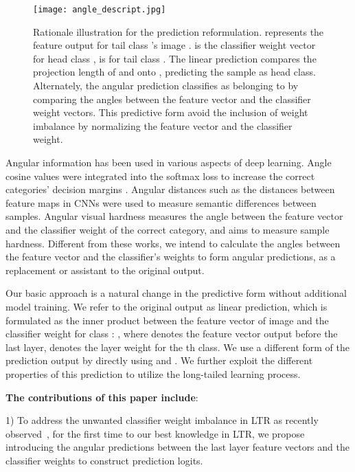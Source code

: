 \documentclass[10pt,twocolumn,letterpaper]{article}
\begin{document}
\begin{figure}[t!]
  \centering
   \texttt{[image: angle\_descript.jpg]}
   \caption{Rationale illustration for the prediction reformulation.  represents the feature output for tail class 's image .  is the classifier weight vector for head class ,  is for tail class . The linear prediction compares the projection length of  and  onto , predicting the sample as head class. Alternately, the angular prediction classifies  as belonging to  by comparing the angles between the feature vector and the classifier weight vectors. This predictive form avoid the inclusion of weight imbalance by normalizing the feature vector and the classifier weight.}
   \vspace{-5pt}
   \label{fig:ang_decrib}
\end{figure}

Angular information has been used in various aspects of deep learning. Angle cosine values were integrated into the softmax loss to increase the correct categories' decision margins \cite{largemargin}. Angular distances such as the distances between feature maps \cite{decoupledNet} in CNNs were used to measure semantic differences between samples. Angular visual hardness \cite{avh} measures the angle between the feature vector and the classifier weight of the correct category, and aims to measure sample hardness. Different from these works, we intend to calculate the angles between the feature vector and the classifier's weights to form angular predictions, as a replacement or assistant to the original output. 

Our basic approach is a natural change in the predictive form without additional model training. We refer to the original output as linear prediction, which is formulated as the inner product between the feature vector of image  and the classifier weight for class : , where  denotes the feature vector output before the last layer,  denotes the layer weight for the th class. We use a different form of the prediction output by directly using  and . We further exploit the different properties of this prediction to utilize the long-tailed learning process. 

\textbf{The contributions of this paper include}:

1) To address the unwanted classifier weight imbalance in LTR as recently observed~\cite{bgs}, for the first time to our best knowledge in LTR, we propose introducing the angular predictions between the last layer feature vectors and the classifier weights to construct prediction logits.
\end{document}
